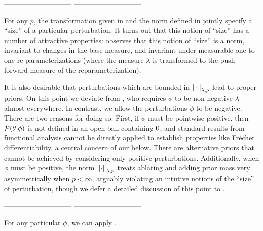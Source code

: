 -----------------------------
-----------------------------


For any $p$, the transformation given in  and the norm
defined in  jointly specify a ``size'' of a particular
perturbation.   It turns out that this notion of ``size'' has a number of
attractive properties: \citep[Result 2]{gustafson:1996:local} observes that this
notion of ``size'' is a norm, invariant to changes in the base measure, and
invariant under measurable one-to-one re-parameterizations (where the measure
$\lambda$ is transformed to the push-forward measure of the reparameterization).

It is also desirable that perturbations which are bounded in
$\left\Vert\cdot\right\Vert_{\lambda,p}$ lead to proper priors.  On this point we deviate from
\citep{gustafson:1996:local}, who requires $\phi$ to be non-negative
$\lambda$-almost everywhere.  In contrast, we allow the perturbations $\phi$ to
be negative. There are two reasons for doing so.  First, if $\phi$ must be
pointwise positive, then $\mathcal{P}(\theta \vert \phi)$ is not defined in an open ball
containing $0$, and standard results from functional analysis cannot be
directly applied to establish properties like Fr{\'e}chet differentiability, a
central concern of our  below.  There are alternative
priors that cannot be achieved by considering only positive perturbations.
Additionally, when $\phi$ must be positive, the norm $\left\Vert\cdot\right\Vert_{\lambda, p}$
treats ablating and adding prior mass very asymmetrically when $p < \infty$,
arguably violating an intutive notions of the ``size'' of perturbation, though
we defer a detailed discussion of this point to .


-----------------------------
-----------------------------

For any particular $\phi$, we can apply .
%

